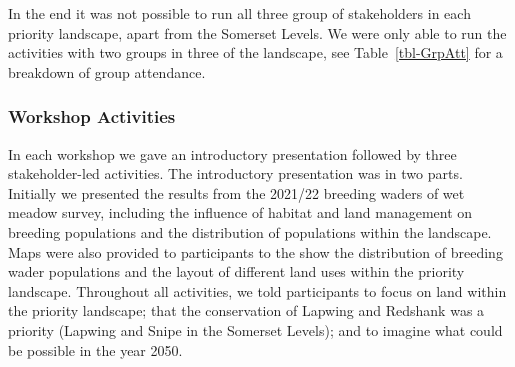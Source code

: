 \documentclass[
  12pt,
  letterpaper,
  DIV=11,
  numbers=noendperiod]{scrartcl}
\begin{document}
In the end it was not possible to run all three group of stakeholders in
each priority landscape, apart from the Somerset Levels. We were only
able to run the activities with two groups in three of the landscape,
see Table~\ref{tbl-GrpAtt} for a breakdown of group attendance.

\begin{table}

\caption{\label{tbl-GrpAtt}Workshop attendance for the three different
stakeholder groups across the four priority landscapes. Note if only one
member of a stakeholder group attended a workshop then this individual
was gnerally moved into one of the other groups. Number of attendees for
each group is shown in brackets.}


\end{table}%

\subsubsection{Workshop Activities}\label{workshop-activities}

In each workshop we gave an introductory presentation followed by three
stakeholder-led activities. The introductory presentation was in two
parts. Initially we presented the results from the 2021/22 breeding
waders of wet meadow survey, including the influence of habitat and land
management on breeding populations and the distribution of populations
within the landscape. Maps were also provided to participants to the
show the distribution of breeding wader populations and the layout of
different land uses within the priority landscape. Throughout all
activities, we told participants to focus on land within the priority
landscape; that the conservation of Lapwing and Redshank was a priority
(Lapwing and Snipe in the Somerset Levels); and to imagine what could be
possible in the year 2050.
\end{document}
